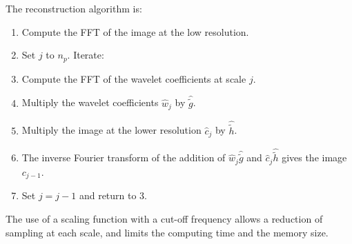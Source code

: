

 
The reconstruction algorithm is:
\begin{enumerate}
\item Compute  the FFT of the image at the low resolution.
\item Set $j$ to $n_p$. Iterate:
\item Compute the FFT of the wavelet coefficients at scale $j$.
\item Multiply  the wavelet coefficients $\hat{w}_j$ by $\hat{\tilde{g}}$.
\item Multiply   the image at the lower resolution $\hat{c}_j$ by 
$\hat{\tilde{h}}$.
\item The inverse Fourier transform of the addition of  
$\hat{w}_j\hat{\tilde{g}}$ and $\hat{c}_j\hat{\tilde{h}}$ gives the 
image $c_{j-1}$.
\item Set $j = j - 1$ and return to 3.
\end{enumerate}

The use of a scaling function with a cut-off frequency
allows a reduction of sampling at each scale, and limits the  
computing time and the memory size. 

